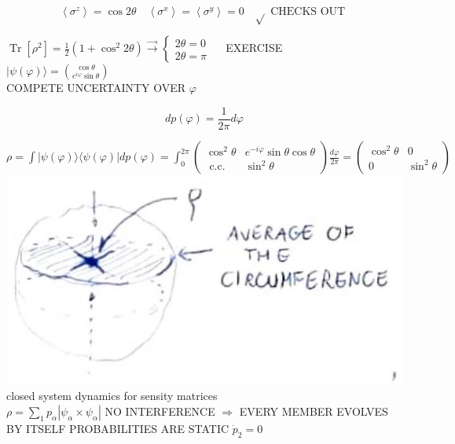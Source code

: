 \documentclass[10pt]{article}
\begin{document}
$$
\left\langle\sigma^{z}\right\rangle=\cos 2 \theta \quad\left\langle\sigma^{x}\right\rangle=\left\langle\sigma^{y}\right\rangle=0 \quad \sqrt{ } \text { CHECKS OUT }
$$

$\operatorname{Tr}\left[\rho^{2}\right]=\frac{1}{2}\left(1+\cos ^{2} 2 \theta\right) \xrightarrow{\longrightarrow}\left\{\begin{array}{l}2 \theta=0 \\ 2 \theta=\pi\end{array} \quad\right.$ EXERCISE\\
$|\psi(\varphi)\rangle=\binom{\cos \theta}{e^{i \varphi} \sin \theta}$\\
COMPETE UNCERTAINTY OVER $\varphi$

$$
d p(\varphi)=\frac{1}{2 \pi} d \varphi
$$

$\rho=\int|\psi(\varphi)\rangle\langle\psi(\varphi)| d p(\varphi)=\int_{0}^{2 \pi}\left(\begin{array}{cc}\cos ^{2} \theta & e^{-i \varphi} \sin \theta \cos \theta \\ \text { c.c. } & \sin ^{2} \theta\end{array}\right) \frac{d \varphi}{2 \pi}=\left(\begin{array}{cc}\cos ^{2} \theta & 0 \\ 0 & \sin ^{2} \theta\end{array}\right)$\\
\includegraphics[max width=\textwidth, center]{2025_10_16_1bd50d0393172dac5e59g-03}\\
closed system dynamics for sensity matrices\\
$\rho=\sum_{1} p_{\alpha}\left|\psi_{\alpha} \times \psi_{\alpha}\right|$ NO INTERFERENCE $\Rightarrow$ EVERY MEMBER EVOLVES BY ITSELF PROBABILITIES ARE STATIC $\dot{p}_{2}=0$
\end{document}
